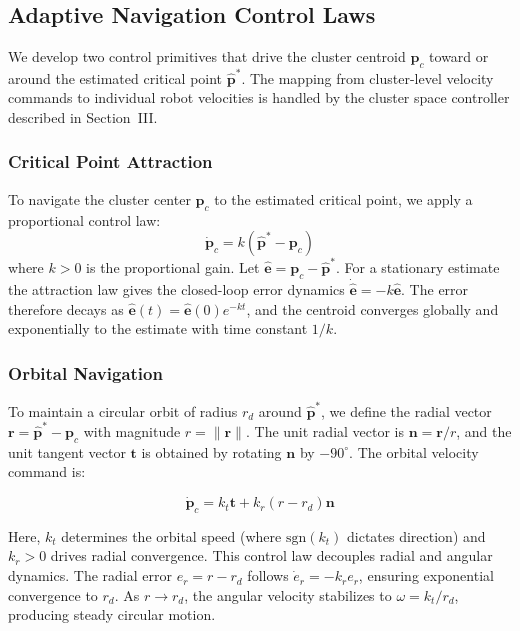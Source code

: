 \documentclass[lettersize,journal]{IEEEtran}
\begin{document}
\subsection{Adaptive Navigation Control Laws}
\label{sec:control_primitives}

We develop two control primitives that drive the cluster centroid $\mathbf{p}_c$ toward or around the estimated critical point $\hat{\mathbf{p}}^*$. The mapping from cluster-level velocity commands to individual robot velocities is handled by the cluster space controller described in Section~III.

\subsubsection{Critical Point Attraction}
To navigate the cluster center $\mathbf{p}_c$ to the estimated critical point, we apply a proportional control law:
\begin{equation}\label{eq:10}
\dot{\mathbf{p}}_c = k(\hat{\mathbf{p}}^* - \mathbf{p}_c)
\end{equation}
where $k > 0$ is the proportional gain. Let $\hat{\mathbf{e}} = \mathbf{p}_c - \hat{\mathbf{p}}^*$. For a stationary estimate the attraction law gives the closed-loop error dynamics $\dot{\hat{\mathbf{e}}} = -k\hat{\mathbf{e}}$. The error therefore decays as $\hat{\mathbf{e}}(t) = \hat{\mathbf{e}}(0)e^{-kt}$, and the centroid converges globally and exponentially to the estimate with time constant $1/k$.

\subsubsection{Orbital Navigation}
To maintain a circular orbit of radius $r_d$ around $\hat{\mathbf{p}}^*$, we define the radial vector $\mathbf{r} = \hat{\mathbf{p}}^* - \mathbf{p}_c$ with magnitude $r = \|\mathbf{r}\|$. The unit radial vector is $\mathbf{n} = \mathbf{r}/r$, and the unit tangent vector $\mathbf{t}$ is obtained by rotating $\mathbf{n}$ by $-90^\circ$. The orbital velocity command is:

\begin{equation}\label{eq:11}
\dot{\mathbf{p}}_c = k_t \mathbf{t} + k_r(r - r_d)\mathbf{n}
\end{equation}

Here, $k_t$ determines the orbital speed (where $\text{sgn}(k_t)$ dictates direction) and $k_r > 0$ drives radial convergence.
This control law decouples radial and angular dynamics. The radial error $e_r = r - r_d$ follows $\dot{e}_r = -k_r e_r$, ensuring exponential convergence to $r_d$. As $r \to r_d$, the angular velocity stabilizes to $\omega = k_t/r_d$, producing steady circular motion.
\end{document}
